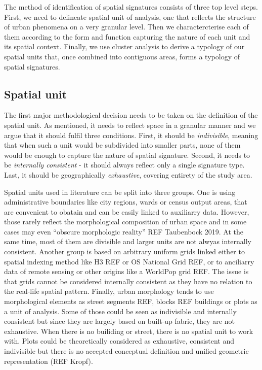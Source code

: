 The method of identification of spatial signatures consists of three top level steps.
First, we need to delineate spatial unit of analysis, one that reflects the structure of
urban phenomena on a very granular level. Then we charactercterise each of them
according to the form and function capturing the nature of each unit and its spatial
context. Finally, we use cluster analysis to derive a typology of our spatial units
that, once combined into contiguous areas, forms a typology of spatial signatures.

\subsection*{Spatial unit}
The first major methodological decision needs to be taken on the definition of the
spatial unit. As mentioned, it needs to reflect space in a granular manner and we argue
that it should fulfil three conditions. First, it should be \textit{indivisible},
meaning that when such a unit would be subdivided into smaller parts, none of them would
be enough to capture the nature of spatial signature. Second, it needs to be
\textit{internally consistent} - it should always reflect only a single signature type.
Last, it should be geographically \textit{exhaustive}, covering entirety of the study
area.

Spatial units used in literature can be split into three groups. One is using
administrative boundaries like city regions, wards or census output areas, that are
convenient to obatain and can be easily linked to auxiliarry data. However,
those rarely reflect the morphological composition of urban space and in some cases may
even “obscure morphologic reality” REF Taubenbock 2019. At the same time, most of them
are divisible and larger units are not alwyas internally consistent. Another group is based on
arbitrary uniform grids linked either to spatial indexing method like H3 REF or OS
National Grid REF, or to anciliarry data of remote sensing or other origins like a
WorldPop grid REF. The issue is that grids cannot be considered internally consistent as
they have no relation to the real-life spatial pattern. Finally, urban morphology tends to use morphological elements as
street segments REF, blocks REF buildings or plots as a unit of analysis. Some of those
could be seen as indivisible and internally consistent but since they are largely based
on built-up fabric, they are not exhaustive. When there is no builiding or street, there
is no spatial unit to work with. Plots could be theoretically considered as exhaustive,
consistent and indivisible but there is no accepted conceptual definition and unified
geometric representation (REF Kropf).

